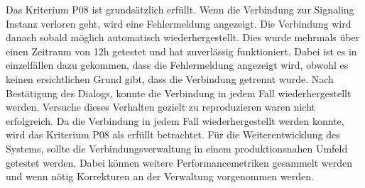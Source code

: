 Das Kriterium P08 ist grundsätzlich erfüllt.
Wenn die Verbindung zur Signaling Instanz verloren geht, wird eine Fehlermeldung angezeigt.
Die Verbindung wird danach sobald möglich automatisch wiederhergestellt.
Dies wurde mehrmals über einen Zeitraum von 12h getestet und hat zuverlässig funktioniert.
Dabei ist es in einzelfällen dazu gekommen, dass die Fehlermeldung angezeigt wird, obwohl es keinen ersichtlichen Grund gibt, dass die Verbindung getrennt wurde.
Nach Bestätigung des Dialogs, konnte die Verbindung in jedem Fall wiederhergestellt werden.
Versuche dieses Verhalten gezielt zu reproduzieren waren nicht erfolgreich.
Da die Verbindung in jedem Fall wiederhergestellt werden konnte, wird das Kriterium P08 als erfüllt betrachtet.
Für die Weiterentwicklung des Systems, sollte die Verbindungsverwaltung in einem produktionsnahen Umfeld getestet werden.
Dabei können weitere Performancemetriken gesammelt werden und wenn nötig Korrekturen an der Verwaltung vorgenommen werden.

\clearpage
